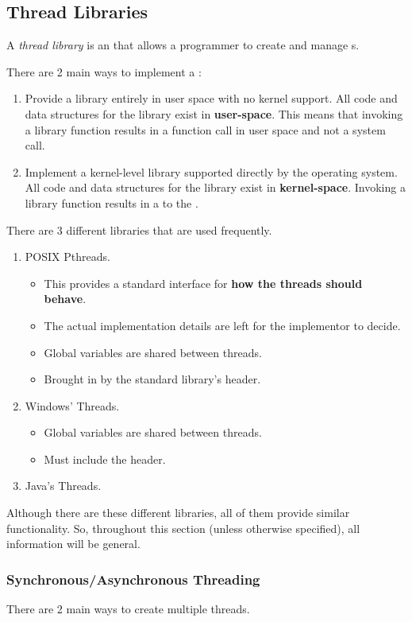 \subsection{Thread Libraries}\label{subsec:Thread_Libraries}
\begin{definition}\label{def:Thread_Library}
  A \emph{thread library} is an  that allows a programmer to create and manage s.
\end{definition}

There are 2 main ways to implement a :
\begin{enumerate}[noitemsep]
\item Provide a library entirely in user space with no kernel support.
  All code and data structures for the library exist in \textbf{user-space}.
  This means that invoking a library function results in a function call in user space and not a system call.
\item Implement a kernel-level library supported directly by the operating system.
  All code and data structures for the library exist in \textbf{kernel-space}.
  Invoking a library function results in a  to the .
\end{enumerate}

There are 3 different libraries that are used frequently.
\begin{enumerate}[noitemsep]
\item POSIX Pthreads.
  \begin{itemize}[noitemsep]
  \item This provides a standard interface for \textbf{how the threads should behave}.
  \item The actual implementation details are left for the implementor to decide.
  \item Global variables are shared between threads.
  \item Brought in by the standard library's  header.
  \end{itemize}
\item Windows' Threads.
  \begin{itemize}[noitemsep]
  \item Global variables are shared between threads.
  \item Must include the  header.
  \end{itemize}
\item Java's Threads.
\end{enumerate}

Although there are these different libraries, all of them provide similar functionality.
So, throughout this section (unless otherwise specified), all information will be general.

\subsubsection{Synchronous/Asynchronous Threading}\label{subsubsec:Sync_Async_Threading}
There are 2 main ways to create multiple threads.


